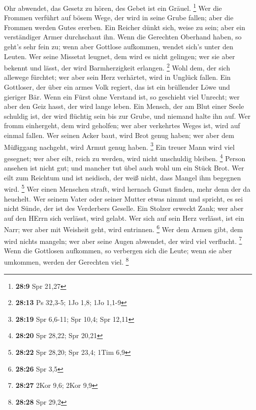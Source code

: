 Ohr abwendet, das Gesetz zu hören, des Gebet ist ein Gräuel. \footnote{\textbf{28:9}
  Spr 21,27}  Wer die Frommen verführt auf bösem Wege, der
wird in seine Grube fallen; aber die Frommen werden Gutes ererben.
 Ein Reicher dünkt sich, weise zu sein; aber ein
verständiger Armer durchschaut ihn.  Wenn die Gerechten
Oberhand haben, so geht's sehr fein zu; wenn aber Gottlose aufkommen,
wendet sich's unter den Leuten.  Wer seine Missetat
leugnet, dem wird es nicht gelingen; wer sie aber bekennt und lässt, der
wird Barmherzigkeit erlangen. \footnote{\textbf{28:13} Ps 32,3-5; 1Jo
  1,8; 1Jo 1,1-9}  Wohl dem, der sich allewege fürchtet;
wer aber sein Herz verhärtet, wird in Unglück fallen.  Ein
Gottloser, der über ein armes Volk regiert, das ist ein brüllender Löwe
und gieriger Bär.  Wenn ein Fürst ohne Verstand ist, so
geschieht viel Unrecht; wer aber den Geiz hasst, der wird lange leben.
 Ein Mensch, der am Blut einer Seele schuldig ist, der wird
flüchtig sein bis zur Grube, und niemand halte ihn auf. 
Wer fromm einhergeht, dem wird geholfen; wer aber verkehrtes Weges ist,
wird auf einmal fallen.  Wer seinen Acker baut, wird Brot
genug haben; wer aber dem Müßiggang nachgeht, wird Armut genug haben.
\footnote{\textbf{28:19} Spr 6,6-11; Spr 10,4; Spr 12,11} 
Ein treuer Mann wird viel gesegnet; wer aber eilt, reich zu werden, wird
nicht unschuldig bleiben. \footnote{\textbf{28:20} Spr 28,22; Spr 20,21}
 Person ansehen ist nicht gut; und mancher tut übel auch
wohl um ein Stück Brot.  Wer eilt zum Reichtum und ist
neidisch, der weiß nicht, dass Mangel ihm begegnen wird. \footnote{\textbf{28:22}
  Spr 28,20; Spr 23,4; 1Tim 6,9}  Wer einen Menschen
straft, wird hernach Gunst finden, mehr denn der da heuchelt.
 Wer seinem Vater oder seiner Mutter etwas nimmt und
spricht, es sei nicht Sünde, der ist des Verderbers Geselle.
 Ein Stolzer erweckt Zank; wer aber auf den HErrn sich
verlässt, wird gelabt.  Wer sich auf sein Herz verlässt,
ist ein Narr; wer aber mit Weisheit geht, wird entrinnen. \footnote{\textbf{28:26}
  Spr 3,5}  Wer dem Armen gibt, dem wird nichts mangeln;
wer aber seine Augen abwendet, der wird viel verflucht. \footnote{\textbf{28:27}
  2Kor 9,6; 2Kor 9,9}  Wenn die Gottlosen aufkommen, so
verbergen sich die Leute; wenn sie aber umkommen, werden der Gerechten
viel. \footnote{\textbf{28:28} Spr 29,2}

